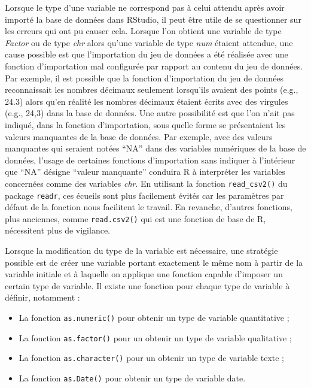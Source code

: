 \documentclass[
]{book}
\providecommand{\tightlist}{%
  \setlength{\itemsep}{0pt}\setlength{\parskip}{0pt}}
\begin{document}
Lorsque le type d'une variable ne correspond pas à celui attendu après avoir importé la base de données dans RStudio, il peut être utile de se questionner sur les erreurs qui ont pu causer cela. Lorsque l'on obtient une variable de type \emph{Factor} ou de type \emph{chr} alors qu'une variable de type \emph{num} étaient attendue, une cause possible est que l'importation du jeu de données a été réalisée avec une fonction d'importation mal configurée par rapport au contenu du jeu de données. Par exemple, il est possible que la fonction d'importation du jeu de données reconnaissait les nombres décimaux seulement lorsqu'ils avaient des points (e.g., 24.3) alors qu'en réalité les nombres décimaux étaient écrits avec des virgules (e.g., 24,3) dans la base de données. Une autre possibilité est que l'on n'ait pas indiqué, dans la fonction d'importation, sous quelle forme se présentaient les valeurs manquantes de la base de données. Par exemple, avec des valeurs manquantes qui seraient notées ``NA'' dans des variables numériques de la base de données, l'usage de certaines fonctions d'importation sans indiquer à l'intérieur que ``NA'' désigne ``valeur manquante'' conduira R à interpréter les variables concernées comme des variables \emph{chr}. En utilisant la fonction \texttt{read\_csv2()} du package \texttt{readr}, ces écueils sont plus facilement évités car les paramètres par défaut de la fonction nous facilitent le travail. En revanche, d'autres fonctions, plus anciennes, comme \texttt{read.csv2()} qui est une fonction de base de R, nécessitent plus de vigilance.

Lorsque la modification du type de la variable est nécessaire, une stratégie possible est de créer une variable portant exactement le même nom à partir de la variable initiale et à laquelle on applique une fonction capable d'imposer un certain type de variable. Il existe une fonction pour chaque type de variable à définir, notamment :

\begin{itemize}
\tightlist
\item
  La fonction \texttt{as.numeric()} pour obtenir un type de variable quantitative ;
\item
  La fonction \texttt{as.factor()} pour un obtenir un type de variable qualitative ;
\item
  La fonction \texttt{as.character()} pour un obtenir un type de variable texte ;
\item
  La fonction \texttt{as.Date()} pour obtenir un type de variable date.
\end{itemize}
\end{document}
